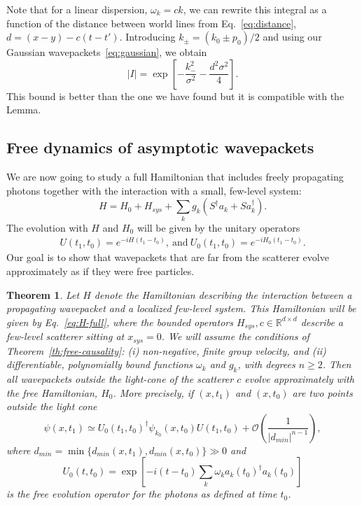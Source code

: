 \documentclass[notitlepage, prx, preprint, amsmath,superscriptaddress,amssymb]{revtex4-1}
\newtheorem{theorem}{Theorem}[section]
\begin{document}
Note that for a linear dispersion, $\omega_k=c k$, we can rewrite this integral as a function of the distance between world lines from Eq.\ \eqref{eq:distance}, $d=(x-y)-c(t-t')$.
Introducing $k_{\pm}=(k_0 \pm p_0)/2$ and using our Gaussian wavepackets\ \eqref{eq:gaussian}, we obtain
\begin{equation}
|I| = \exp\left[-\frac{k_-^2}{\sigma^2}-\frac{d^2\sigma^2}{4}\right].
\label{eq:free-commutator}
\end{equation}
This bound is better than the one we have found but it is compatible with the Lemma.

\subsection{Free dynamics of asymptotic wavepackets}

We are now going to study a full Hamiltonian that includes freely propagating photons together with the interaction with a small, few-level system:
\begin{equation}
H = H_0 + H_{sys} + \sum_k g_k (S^\dagger a_k + S a_k^\dagger).
\label{eq:H-full}
\end{equation}
The evolution with $H$ and $H_0$ will be given by the unitary operators
\begin{align}
U(t_1,t_0) = e^{-iH(t_1-t_0)},~\mbox{and}~ U_0(t_1,t_0)= e^{-iH_0(t_1-t_0)}.
\end{align}
Our goal is to show that wavepackets that are far from the scatterer evolve approximately as if they were free particles.

\begin{theorem}
Let $H$ denote the Hamiltonian describing the interaction between a propagating wavepacket and a localized few-level system. This Hamiltonian will be given by Eq.\ \ref{eq:H-full}, where the bounded operators $H_{sys},c\in \mathbb{R}^{d\times d}$ describe a few-level scatterer sitting at $x_{sys}=0$. We will assume the conditions of Theorem\ \ref{th:free-causality}: (i) non-negative, finite group velocity, and (ii) differentiable, polynomially bound functions $\omega_k$ and $g_k$, with degrees $n\geq 2$. Then all wavepackets outside the light-cone of the scatterer $c$ evolve approximately with the free Hamiltonian, $H_0$. More precisely, if $(x,t_1)$ and $(x,t_0)$ are two points outside the light cone
\begin{equation}
\psi(x,t_1) \simeq U_0(t_1,t_0)^\dagger\psi_{k_0}(x,t_0)U(t_1,t_0)
+\mathcal{O}\left(\frac{1}{|d_{min}|^{n-1}}\right),
\end{equation}
where $d_{min} = \min \{d_{min}(x,t_1),d_{min}(x,t_0)\}\gg 0$ and
\begin{equation}
U_0(t,t_0) = \exp\left[-i(t-t_0)\sum_k\omega_k a_k(t_0)^\dagger a_k(t_0)\right]
\end{equation}
is the free evolution operator for the photons as defined at time $t_0$.
\end{theorem}
\end{document}
